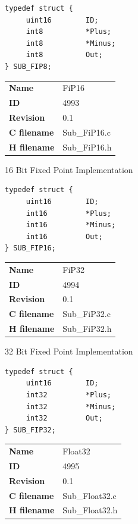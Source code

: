 \begin{lstlisting}
typedef struct {
     uint16        ID;
     int8          *Plus;
     int8          *Minus;
     int8          Out;
} SUB_FIP8;
\end{lstlisting}

\ifdefined \AddTestReports
{}
\fi
{}
\nopagebreak[0]
\begin{tabular}{l l}
\textbf{Name} & FiP16 \tabularnewline
\textbf{ID} & 4993 \tabularnewline
\textbf{Revision} & 0.1 \tabularnewline
\textbf{C filename} & Sub\_FiP16.c \tabularnewline
\textbf{H filename} & Sub\_FiP16.h \tabularnewline
\end{tabular}
\vspace{1ex}

16 Bit Fixed Point Implementation

\begin{lstlisting}
typedef struct {
     uint16        ID;
     int16         *Plus;
     int16         *Minus;
     int16         Out;
} SUB_FIP16;
\end{lstlisting}

\ifdefined \AddTestReports
{}
\fi
{}
\nopagebreak[0]
\begin{tabular}{l l}
\textbf{Name} & FiP32 \tabularnewline
\textbf{ID} & 4994 \tabularnewline
\textbf{Revision} & 0.1 \tabularnewline
\textbf{C filename} & Sub\_FiP32.c \tabularnewline
\textbf{H filename} & Sub\_FiP32.h \tabularnewline
\end{tabular}
\vspace{1ex}

32 Bit Fixed Point Implementation

\begin{lstlisting}
typedef struct {
     uint16        ID;
     int32         *Plus;
     int32         *Minus;
     int32         Out;
} SUB_FIP32;
\end{lstlisting}

\ifdefined \AddTestReports
{}
\fi
{}
\nopagebreak[0]
\begin{tabular}{l l}
\textbf{Name} & Float32 \tabularnewline
\textbf{ID} & 4995 \tabularnewline
\textbf{Revision} & 0.1 \tabularnewline
\textbf{C filename} & Sub\_Float32.c \tabularnewline
\textbf{H filename} & Sub\_Float32.h \tabularnewline
\end{tabular}
\vspace{1ex}

